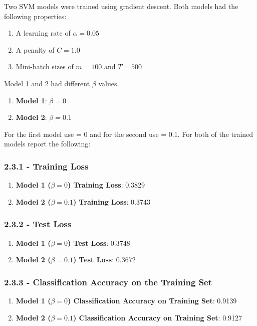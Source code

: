 \documentclass[10pt]{article}
\begin{document}
Two SVM models were trained using gradient descent. Both models had the following properties: 

\begin{enumerate}
\item A learning rate of $\alpha = 0.05 $
\item A penalty of $C = 1.0$
\item Mini-batch sizes of $m = 100$ and $T = 500$
\end{enumerate}

Model 1 and 2 had different $\beta$ values.

\begin{enumerate}
\item \textbf{Model 1}: $\beta = 0 $ 
\item \textbf{Model 2}: $\beta = 0.1 $
\end{enumerate}


 For the first model use   = 0 and for the second use   = 0.1. For both of the trained models report the following:

\subsubsection{2.3.1 - Training Loss}

\begin{enumerate}
\item \textbf{Model 1 ($\beta = 0 $) Training Loss}: 0.3829
\item \textbf{Model 2 ($\beta = 0.1 $) Training Loss}: 0.3743
\end{enumerate}

\subsubsection{2.3.2 - Test Loss}

\begin{enumerate}
\item \textbf{Model 1 ($\beta = 0 $) Test Loss}: 0.3748
\item \textbf{Model 2 ($\beta = 0.1 $) Test Loss}: 0.3672
\end{enumerate}

\subsubsection{2.3.3 - Classification Accuracy on the Training Set}

\begin{enumerate}
\item \textbf{Model 1 ($\beta = 0 $) Classification Accuracy on Training Set}: 0.9139
\item \textbf{Model 2 ($\beta = 0.1 $) Classification Accuracy on Training Set}: 0.9127
\end{enumerate}
\end{document}
